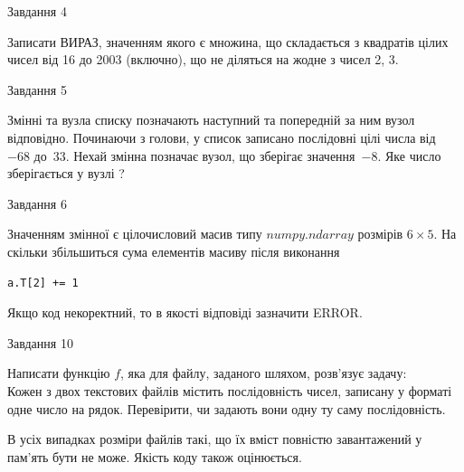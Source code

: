 \documentclass[12pt, ukrainian]{article}
\begin{document}
{\begin{minipage}[t]{8.0cm}
\end{minipage}


               
{\begin{center}Завдання {4}\end{center}}
\vspace{-4mm}
Записати ВИРАЗ, значенням якого є множина, що складається з квадратів цілих чисел від 16 до 2003 (включно), що не діляться на жодне з чисел 2, 3.\par

\vspace{10mm}
               
{\begin{center}Завдання {5}\end{center}}
\vspace{-4mm}
Змінні  та  вузла списку позначають наступний та попередній за ним вузол відповідно. Починаючи з голови, у список записано послідовні цілі числа від~$-68$ до~$33$. Нехай змінна  позначає вузол, що зберігає значення~$-8$.
Яке число зберігається у вузлі  ?\par

               
{\begin{center}Завдання {6}\end{center}}
\vspace{-4mm}
Значенням змінної  є цілочисловий масив типу $numpy.ndarray$ розмірів $6{\times}5$. На скільки збільшиться сума елементів масиву  після виконання
\begin{verbatim}
a.T[2] += 1
\end{verbatim}


Якщо код некоректний, то в якості відповіді зазначити ERROR.\par

               
{\begin{center}Завдання {10}\end{center}}
\vspace{-4mm}

Написати функцію $f$, яка для файлу, заданого шляхом, розв’язує задачу:\\ Кожен з двох текстових файлів містить послідовність чисел, записану у форматі одне число на рядок.  Перевірити, чи задають вони одну ту саму послідовність.

В усіх випадках розміри файлів такі, що їх вміст повністю завантажений у пам'ять бути не може. Якість коду також оцінюється.



}
\end{document}
